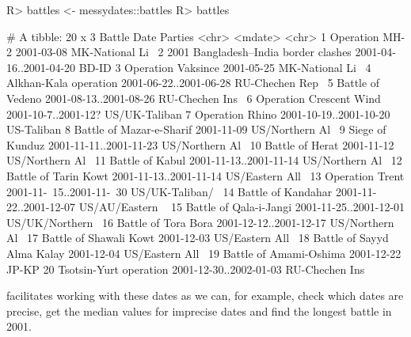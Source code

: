 \documentclass[
]{jss}
\begin{document}
\begin{CodeChunk}
\begin{CodeInput}
R> battles <- messydates::battles
R> battles
\end{CodeInput}
\begin{CodeOutput}
# A tibble: 20 x 3
   Battle                               Date                     Parties        
   <chr>                                <mdate>                  <chr>          
 1 Operation MH-2                       2001-03-08               MK-National Li~
 2 2001 Bangladesh–India border clashes 2001-04-16..2001-04-20   BD-ID          
 3 Operation Vaksince                   2001-05-25               MK-National Li~
 4 Alkhan-Kala operation                2001-06-22..2001-06-28   RU-Chechen Rep~
 5 Battle of Vedeno                     2001-08-13..2001-08-26   RU-Chechen Ins~
 6 Operation Crescent Wind              2001-10-7..2001-12?      US/UK-Taliban  
 7 Operation Rhino                      2001-10-19..2001-10-20   US-Taliban     
 8 Battle of Mazar-e-Sharif             2001-11-09               US/Northern Al~
 9 Siege of Kunduz                      2001-11-11..2001-11-23   US/Northern Al~
10 Battle of Herat                      2001-11-12               US/Northern Al~
11 Battle of Kabul                      2001-11-13..2001-11-14   US/Northern Al~
12 Battle of Tarin Kowt                 2001-11-13..2001-11-14   US/Eastern All~
13 Operation Trent                      2001-11-~15..2001-11-~30 US/UK-Taliban/~
14 Battle of Kandahar                   2001-11-22..2001-12-07   US/AU/Eastern ~
15 Battle of Qala-i-Jangi               2001-11-25..2001-12-01   US/UK/Northern~
16 Battle of Tora Bora                  2001-12-12..2001-12-17   US/Northern Al~
17 Battle of Shawali Kowt               2001-12-03               US/Eastern All~
18 Battle of Sayyd Alma Kalay           2001-12-04               US/Eastern All~
19 Battle of Amami-Oshima               2001-12-22               JP-KP          
20 Tsotsin-Yurt operation               2001-12-30..2002-01-03   RU-Chechen Ins~
\end{CodeOutput}
\end{CodeChunk}

 facilitates working with these dates as we can, for
example, check which dates are precise, get the median values for
imprecise dates and find the longest battle in 2001.
\end{document}
